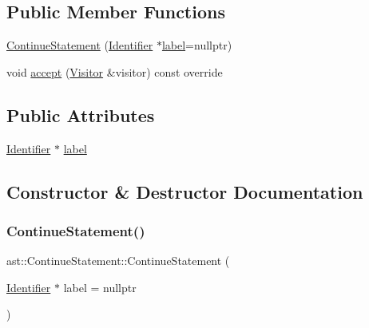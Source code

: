 \subsection*{Public Member Functions}
\begin{DoxyCompactItemize}
\item 
\hyperlink{structast_1_1_continue_statement_a59aae4f17cdf011db49ae621a7a278f4}{Continue\+Statement} (\hyperlink{structast_1_1_identifier}{Identifier} $\ast$\hyperlink{structast_1_1_continue_statement_ad9bea443914e61a2f69861d7f45e17bc}{label}=nullptr)
\item 
void \hyperlink{structast_1_1_continue_statement_a60101cc01b95c4fab4edb2adf7cb70f3}{accept} (\hyperlink{structast_1_1_visitor}{Visitor} \&visitor) const override
\end{DoxyCompactItemize}
\subsection*{Public Attributes}
\begin{DoxyCompactItemize}
\item 
\hyperlink{structast_1_1_identifier}{Identifier} $\ast$ \hyperlink{structast_1_1_continue_statement_ad9bea443914e61a2f69861d7f45e17bc}{label}
\end{DoxyCompactItemize}


\subsection{Constructor \& Destructor Documentation}
\mbox{\label{structast_1_1_continue_statement_a59aae4f17cdf011db49ae621a7a278f4}} 
\subsubsection{\texorpdfstring{Continue\+Statement()}{ContinueStatement()}}
{\footnotesize\ttfamily ast\+::\+Continue\+Statement\+::\+Continue\+Statement (\begin{DoxyParamCaption}\item[{\hyperlink{structast_1_1_identifier}{Identifier} $\ast$}]{label = {\ttfamily nullptr} }\end{DoxyParamCaption})\hspace{0.3cm}{\ttfamily [inline]}}



